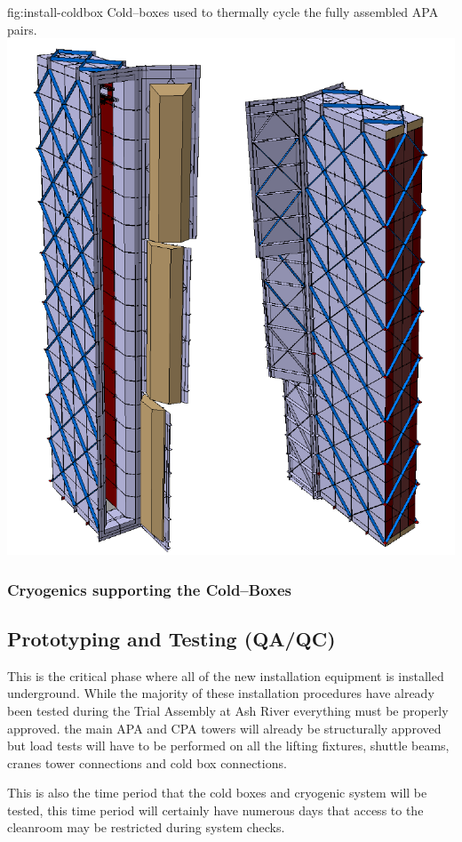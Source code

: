 \begin{dunefigure}{fig:install-coldbox}
  {Cold--boxes used to thermally cycle the fully assembled APA pairs. }
\includegraphics[width=.5\textwidth]{graphics/install-coldbox.pdf}
\end{dunefigure}

\subsubsection{Cryogenics supporting the Cold--Boxes}


\clearpage

\subsection{Prototyping and Testing (QA/QC)}
\label{sec:fdsp-tc-infr-qaqc}
This is the critical phase where all of the new installation equipment is installed underground.  While the majority of these installation procedures have already been tested during the Trial Assembly at Ash River everything must be properly approved. the main APA and CPA towers will already be structurally approved but load tests will have to be performed on all the lifting fixtures, shuttle beams, cranes tower connections and cold box connections. 

This is also the time period that the cold boxes and cryogenic system will be tested, this time period will certainly have numerous days that access to the cleanroom may be restricted during system checks.


